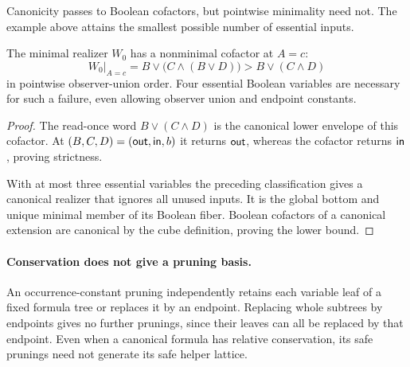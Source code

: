 Canonicity passes to Boolean cofactors, but pointwise minimality need not.
The example above attains the smallest possible number of essential inputs.

\begin{corollary}
\label{core:cor:minimal-cofactor-obstruction}
The minimal realizer $W_0$ has a nonminimal cofactor at $A=c$:
\[
 W_0|_{A=c}=B\vee\bigl(C\wedge(B\vee D)\bigr)
    > B\vee(C\wedge D)
\]
in pointwise observer-union order.
Four essential Boolean variables are necessary for such a failure,
even allowing observer union and endpoint constants.
\end{corollary}
\begin{proof}
The read-once word $B\vee(C\wedge D)$ is the canonical lower envelope
of this cofactor. At $(B,C,D)=(\mathsf{out},\mathsf{in},b)$ it returns $\mathsf{out}$, whereas
the cofactor returns $\mathsf{in}$, proving strictness.

With at most three essential variables the preceding classification gives
a canonical realizer that ignores all unused inputs. It is the global
bottom and unique minimal member of its Boolean fiber. Boolean cofactors
of a canonical extension are canonical by the cube definition, proving
the lower bound.
\end{proof}

\paragraph{Conservation does not give a pruning basis.}
An occurrence-constant pruning independently retains each variable leaf
of a fixed formula tree or replaces it by an endpoint. Replacing whole
subtrees by endpoints gives no further prunings, since their leaves can
all be replaced by that endpoint. Even when a canonical formula has
relative conservation, its safe prunings need not generate its safe
helper lattice.

